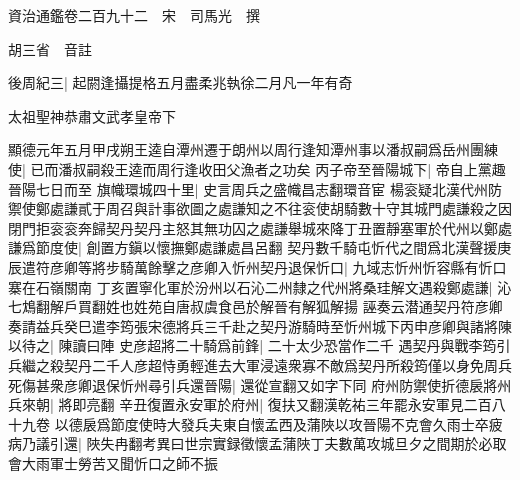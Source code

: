 






























































資治通鑑卷二百九十二　宋　司馬光　撰

胡三省　音註

後周紀三|{
	起閼逢攝提格五月盡柔兆執徐二月凡一年有奇}


太祖聖神恭肅文武孝皇帝下

顯德元年五月甲戌朔王逵自潭州遷于朗州以周行逢知潭州事以潘叔嗣爲岳州團練使|{
	已而潘叔嗣殺王逵而周行逢收田父漁者之功矣}
丙子帝至晉陽城下|{
	帝自上黨趣晉陽七日而至}
旗幟環城四十里|{
	史言周兵之盛幟昌志翻環音宦}
楊衮疑北漢代州防禦使鄭處謙貳于周召與計事欲圖之處謙知之不往衮使胡騎數十守其城門處謙殺之因閉門拒衮衮奔歸契丹契丹主怒其無功囚之處謙舉城來降丁丑置靜塞軍於代州以鄭處謙爲節度使|{
	創置方鎭以懷撫鄭處謙處昌呂翻}
契丹數千騎屯忻代之間爲北漢聲援庚辰遣符彦卿等將步騎萬餘擊之彦卿入忻州契丹退保忻口|{
	九域志忻州忻容縣有忻口寨在石嶺關南}
丁亥置寧化軍於汾州以石沁二州隸之代州將桑珪解文遇殺鄭處謙|{
	沁七鴆翻解戶買翻姓也姓苑自唐叔虞食邑於解晉有解狐解揚}
誣奏云潜通契丹符彦卿奏請益兵癸巳遣李筠張宋德將兵三千赴之契丹游騎時至忻州城下丙申彦卿與諸將陳以待之|{
	陳讀曰陣}
史彦超將二十騎爲前鋒|{
	二十太少恐當作二千}
遇契丹與戰李筠引兵繼之殺契丹二千人彦超恃勇輕進去大軍浸遠衆寡不敵爲契丹所殺筠僅以身免周兵死傷甚衆彦卿退保忻州尋引兵還晉陽|{
	還從宣翻又如字下同}
府州防禦使折德扆將州兵來朝|{
	將即亮翻}
辛丑復置永安軍於府州|{
	復扶又翻漢乾祐三年罷永安軍見二百八十九卷}
以德扆爲節度使時大發兵夫東自懷孟西及蒲陜以攻晉陽不克會久雨士卒疲病乃議引還|{
	陜失冉翻考異曰世宗實録徵懷孟蒲陜丁夫數萬攻城旦夕之間期於必取會大雨軍士勞苦又聞忻口之師不振}



